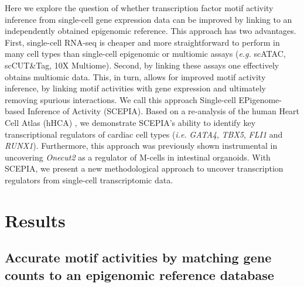 Here we explore the question of whether transcription factor motif activity inference from single-cell gene expression data can be improved by linking to an independently obtained epigenomic reference. This approach has two advantages. First, single-cell RNA-seq is cheaper and more straightforward to perform in many cell types than single-cell epigenomic or multiomic assays (\textit{e.g.} scATAC, scCUT\&Tag, 10X Multiome). Second, by linking these assays one effectively obtains multiomic data. This, in turn, allows for improved motif activity inference, by linking motif activities with gene expression and ultimately removing spurious interactions. We call this approach Single-cell EPigenome-based Inference of Activity (SCEPIA). Based on a re-analysis of  the human Heart Cell Atlas (hHCA) \cite{Kanemaru2023}, we demonstrate SCEPIA's ability to identify key transcriptional regulators of cardiac cell types (\textit{i.e.} \textit{GATA4}, \textit{TBX5}, \textit{FLI1} and \textit{RUNX1}). Furthermore, this approach was previously shown instrumental in uncovering \textit{Onecut2} as a regulator of M-cells in intestinal organoids\cite{LunaVelez2023}. With SCEPIA, we present a new methodological approach to uncover transcription regulators from single-cell transcriptomic data. 

\section{Results}

\subsection{Accurate motif activities by matching gene counts to an epigenomic reference database}

